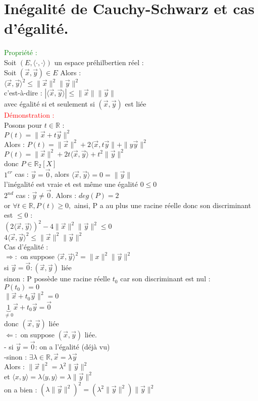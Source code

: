 \documentclass{article}
\begin{document}
\section{Inégalité de Cauchy-Schwarz et cas d'égalité.}
\textcolor{green}{Propriété :} \\
Soit $(E,\langle \cdot , \cdot \rangle)$ un espace préhilbertien réel : \\
Soit $(\vec x, \vec y) \in E$ Alors : \\
$\langle \vec x ,\vec y \rangle^2 \leq  \| \vec x \|^2 \| \vec y \|^2$ \\
c'est-à-dire : $|\langle \vec x ,\vec y \rangle| \leq \| \vec x \| \| \vec y \|$ \\
avec égalité si et seulement si $(\vec x, \vec y)$ est liée \\
\textcolor{red}{Démonstration :} \\
Posons pour $t \in \mathbb R$ : \\
$P(t)= \| \vec x + t \vec y \|^2$ \\
Alors : $P(t)= \| \vec x \|^2 +2 \langle \vec x, t \vec y \| + \| y\vec y \|^2$ \\
$P(t)=\| \vec x \|^2 +2 t \langle \vec x ,\vec y \rangle + t^2 \| \vec y \|^2$ \\
donc $P \in \mathbb R_2 [X]$ \\
$1^{er}$ cas : $\vec y= \vec 0$, alors $\langle \vec x , \vec y \rangle=0= \| \vec y \|$ \\
l'inégalité est vraie et est même une égalité $0 \leq 0$ \\
$2^{nd}$ cas : $\vec y \neq \vec 0$. Alors : $deg(P)=2$ \\
or $\forall t \in \mathbb R, P(t) \geq 0,$ ainsi, P a au plus une racine réelle donc son discriminant est $\leq 0$ : \\
$(2 \langle \vec x , \vec y \rangle)^2-4 \| \vec x \|^2 \| \vec y \|^2 \leq 0$ \\
$4 \langle \vec x ,\vec y \rangle^2 \leq \| \vec x \|^2 \| \vec y \|^2$ \\
Cas d'égalité : \\
$\Rightarrow :$ on suppose $\langle \vec x, \vec y \rangle^2= \| x \|^2 \| \vec y \|^2$ \\
si $\vec y= \vec 0 : (\vec x, \vec y)$ liée \\
sinon :  P possède une racine réelle $t_0$ car son discriminant est nul : \\
$P(t_0)=0$ \\
$\|\vec x + t_0 \vec y \|^2=0$ \\
$\underbrace{1}_{\neq 0} \vec x + t_0 \vec y = \vec 0 $  \\
donc $(\vec x, \vec y)$ liée \\
$\Leftarrow :$ on suppose $(\vec x, \vec y)$ liée. \\
- si $\vec y =\vec 0$: on a l'égalité (déjà vu) \\
-sinon : $\exists \lambda \in \mathbb R, \vec x= \lambda \vec y$ \\
Alors : $\| \vec x \|^2= \lambda^2 \| \vec y \|^2$ \\
et $\langle x,y \rangle = \lambda \langle y,y \rangle= \lambda \| \vec y \|^2$ \\
on a bien : $( \lambda \| \vec y \|^2)^2=(\lambda^2 \| \vec y \|^2) \| \vec y \|^2$
\end{document}
